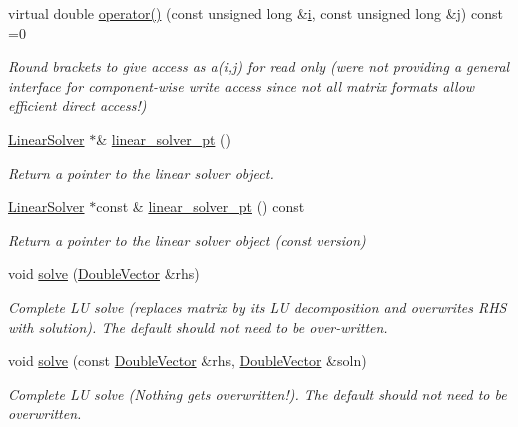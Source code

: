 \begin{DoxyCompactItemize}
virtual double \hyperlink{classoomph_1_1DoubleMatrixBase_a20b85f0286f80464f42f0846fede2d77}{operator()} (const unsigned long \&\hyperlink{cfortran_8h_adb50e893b86b3e55e751a42eab3cba82}{i}, const unsigned long \&j) const =0
\begin{DoxyCompactList}\small\item\em Round brackets to give access as a(i,j) for read only (we\textquotesingle{}re not providing a general interface for component-\/wise write access since not all matrix formats allow efficient direct access!) \end{DoxyCompactList}\item 
\hyperlink{classoomph_1_1LinearSolver}{Linear\+Solver} $\ast$\& \hyperlink{classoomph_1_1DoubleMatrixBase_a0469ef03089f7f216931940305c38194}{linear\+\_\+solver\+\_\+pt} ()
\begin{DoxyCompactList}\small\item\em Return a pointer to the linear solver object. \end{DoxyCompactList}\item 
\hyperlink{classoomph_1_1LinearSolver}{Linear\+Solver} $\ast$const  \& \hyperlink{classoomph_1_1DoubleMatrixBase_af3a865cc9920a2fe7d895b638667be18}{linear\+\_\+solver\+\_\+pt} () const
\begin{DoxyCompactList}\small\item\em Return a pointer to the linear solver object (const version) \end{DoxyCompactList}\item 
void \hyperlink{classoomph_1_1DoubleMatrixBase_a4d445c4a1204da569f40ec1bdace9ef3}{solve} (\hyperlink{classoomph_1_1DoubleVector}{Double\+Vector} \&rhs)
\begin{DoxyCompactList}\small\item\em Complete LU solve (replaces matrix by its LU decomposition and overwrites R\+HS with solution). The default should not need to be over-\/written. \end{DoxyCompactList}\item 
void \hyperlink{classoomph_1_1DoubleMatrixBase_ac35083cf8225822363c25b921b4ca1ce}{solve} (const \hyperlink{classoomph_1_1DoubleVector}{Double\+Vector} \&rhs, \hyperlink{classoomph_1_1DoubleVector}{Double\+Vector} \&soln)
\begin{DoxyCompactList}\small\item\em Complete LU solve (Nothing gets overwritten!). The default should not need to be overwritten. \end{DoxyCompactList}\item 

\end{DoxyCompactItemize}
